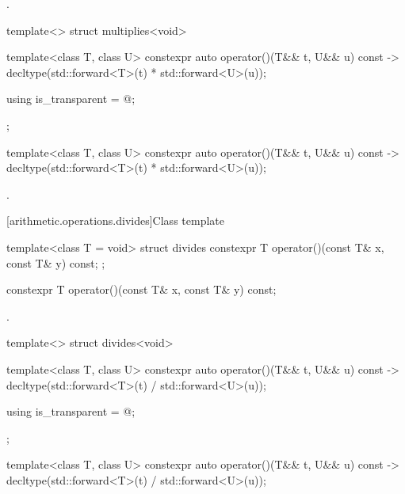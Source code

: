 \begin{itemdescr}
\pnum\returns {}.
\end{itemdescr}

%
\begin{itemdecl}
template<> struct multiplies<void> {
  template<class T, class U> constexpr auto operator()(T&& t, U&& u) const
    -> decltype(std::forward<T>(t) * std::forward<U>(u));

  using is_transparent = @\unspec@;
};
\end{itemdecl}

%
\begin{itemdecl}
template<class T, class U> constexpr auto operator()(T&& t, U&& u) const
    -> decltype(std::forward<T>(t) * std::forward<U>(u));
\end{itemdecl}

\begin{itemdescr}
\pnum\returns {}.
\end{itemdescr}

[arithmetic.operations.divides]{Class template }

%
\begin{itemdecl}
template<class T = void> struct divides {
  constexpr T operator()(const T& x, const T& y) const;
};
\end{itemdecl}

%
\begin{itemdecl}
constexpr T operator()(const T& x, const T& y) const;
\end{itemdecl}

\begin{itemdescr}
\pnum\returns {}.
\end{itemdescr}

%
\begin{itemdecl}
template<> struct divides<void> {
  template<class T, class U> constexpr auto operator()(T&& t, U&& u) const
    -> decltype(std::forward<T>(t) / std::forward<U>(u));

  using is_transparent = @\unspec@;
};
\end{itemdecl}

%
\begin{itemdecl}
template<class T, class U> constexpr auto operator()(T&& t, U&& u) const
    -> decltype(std::forward<T>(t) / std::forward<U>(u));
\end{itemdecl}

